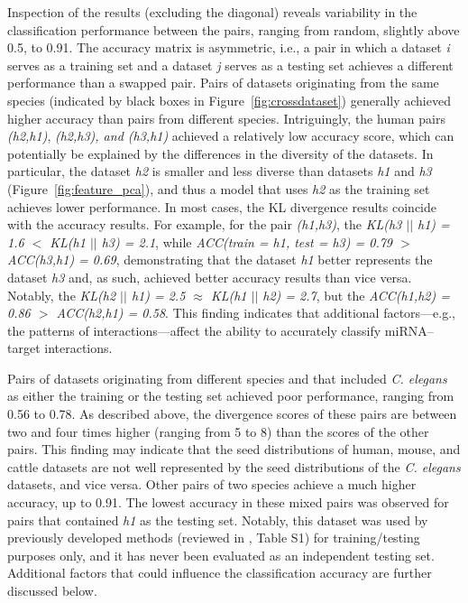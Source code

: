 \documentclass{bmcart}
\begin{document}
Inspection of the results (excluding the diagonal) reveals variability in the classification performance between the pairs, ranging from random, slightly above 0.5, to 0.91. The accuracy matrix is asymmetric, i.e., a pair in which a dataset \textit{i} serves as a training set and a dataset \textit{j} serves as a testing set achieves a different performance than a swapped pair. Pairs of datasets originating from the same species (indicated by black boxes in Figure~\ref{fig:crossdataset}) generally achieved higher accuracy than pairs from different species. Intriguingly, the human pairs \textit{(h2,h1)}, \textit{(h2,h3), and \textit{(h3,h1)}} achieved a relatively low accuracy score, which can potentially be explained by the differences in the diversity of the datasets. In particular, the dataset \textit{h2} is smaller and less diverse than datasets \textit{h1} and \textit{h3} (Figure~\ref{fig:feature_pca}), and thus a model that uses \textit{h2} as the training set achieves lower performance. In most cases, the KL divergence results coincide with the accuracy results. For example, for the pair \textit{(h1,h3)}, the \textit{KL(h3 $||$ h1) = 1.6 $<$ KL(h1 $||$ h3) = 2.1}, while \textit{ACC(train = h1, test = h3) = 0.79 $>$ ACC(h3,h1) = 0.69}, demonstrating that the dataset \textit{h1} better represents the dataset \textit{h3} and, as such, achieved better accuracy results than vice versa. Notably, the \textit{KL(h2 $||$ h1) = 2.5 $\approx$ KL(h1 $||$ h2) = 2.7}, but the \textit{ACC(h1,h2) = 0.86 $>$ ACC(h2,h1) = 0.58}. This finding indicates that additional factors---e.g., the patterns of interactions---affect the ability to accurately classify miRNA--target interactions.

Pairs of datasets originating from different species and that included \textit{C. elegans} as either the training or the testing set achieved poor performance, ranging from 0.56 to 0.78. As described above, the divergence scores of these pairs are between two and four times higher (ranging from 5 to 8) than the scores of the other pairs. This finding may indicate that the seed distributions of human, mouse, and cattle datasets are not well represented by the seed distributions of the \textit{C. elegans} datasets, and vice versa. Other pairs of two species achieve a much higher accuracy, up to 0.91. The lowest accuracy in these mixed pairs was observed for pairs that contained \textit{h1} as the testing set. Notably, this dataset was used by previously developed methods (reviewed in , Table S1) for training/testing purposes only, and it has never been evaluated as an independent testing set. Additional factors that could influence the classification accuracy are further discussed below.
\end{document}
